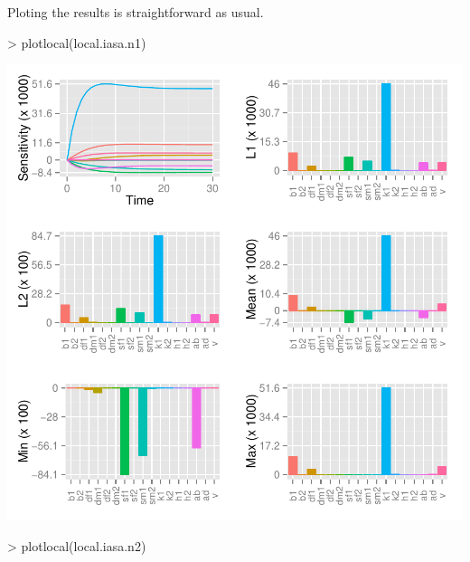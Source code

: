 \documentclass[a4paper]{article}
\begin{document}
Ploting the results is straightforward as usual.
\begin{Schunk}
\begin{Sinput}
> plotlocal(local.iasa.n1)
\end{Sinput}
\end{Schunk}
\begin{center}
\begin{Schunk}
\begin{Soutput}
\end{Soutput}
\end{Schunk}
\includegraphics{capm_example-042}
\end{center}
\begin{Schunk}
\begin{Sinput}
> plotlocal(local.iasa.n2)
\end{Sinput}
\end{Schunk}
\end{document}
